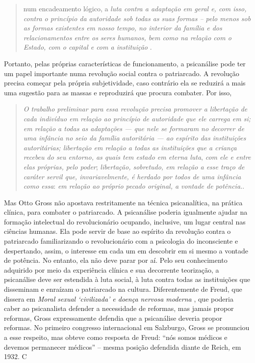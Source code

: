 \begin{quote}
num encadeamento lógico, a \emph{luta contra a adaptação em geral e, com
isso, contra o princípio da autoridade sob todas as suas formas -- pelo
menos sob as formas existentes em nosso tempo, no interior da família e
dos relacionamentos entre os seres humanos, bem como na relação com o
Estado, com o capital e com a instituição} .
\end{quote}

Portanto, pelas próprias características de funcionamento, a psicanálise
pode ter um papel importante numa revolução social contra o patriarcado.
A revolução precisa começar pela própria subjetividade, caso contrário
ela se reduzirá a mais uma sugestão para as massas e reproduzirá que
procura combater. Por isso,

\begin{quote}
\emph{O trabalho preliminar para essa revolução precisa promover a
libertação de cada indivíduo em relação ao princípio de autoridade que
ele carrega em si; em relação a todas as adaptações --- que nele se
formaram no decorrer de uma infância no seio da família autoritária ---
ao espírito das instituições autoritárias; libertação em relação a todas
as instituições que a criança recebeu do seu entorno, as quais tem
estado em eterna luta}, \emph{com ele e entre elas próprias, pelo
poder}; \emph{libertação, sobretudo, em relação a esse traço de caráter
servil que, invariavelmente, é herdado por todos de uma infância como
essa}: \emph{em relação ao próprio pecado original, a vontade de
potência.}.
\end{quote}

Mas Otto Gross não apostava restritamente na técnica psicanalítica, na
prática clínica, para combater o patriarcado. A psicanálise poderia
igualmente ajudar na formação intelectual do revolucionário ocupando,
inclusive, um lugar central nas ciências humanas. Ela pode servir de
base ao espírito da revolução contra o patriarcado familiarizando o
revolucionário com a psicologia do inconsciente e despertando, assim, o
interesse em cada um em descobrir em si mesmo a vontade de potência. No
entanto, ela não deve parar por aí. Pelo seu conhecimento adquirido por
meio da experiência clínica e sua decorrente teorização, a psicanálise
deve ser estendida à luta social, à luta contra todas as instituições
que disseminam e enraízam o patriarcado na cultura. Diferentemente de
Freud, que dissera em \emph{Moral sexual `civilizada' e doença nervosa
moderna} , que poderia caber ao psicanalista defender a necessidade de
reformas, mas jamais propor reformas, Gross expressamente defendia que a
psicanálise deveria propor reformas. No primeiro congresso internacional
em Salzburgo, Gross se pronunciou a esse respeito, mas obteve como
resposta de Freud: ``nós somos médicos e devemos permanecer médicos'' --
mesma posição defendida diante de Reich, em 1932. C

